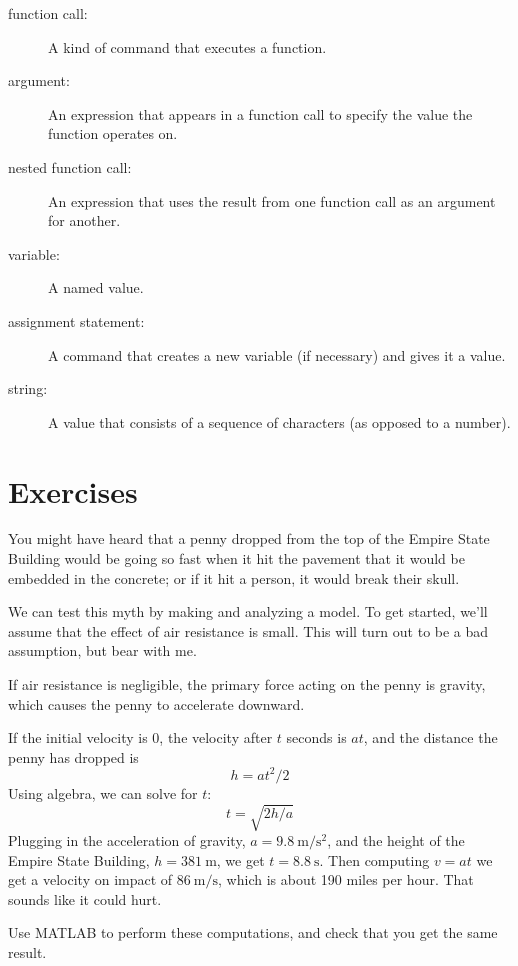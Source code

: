 \documentclass[main.tex]{subfiles}
\begin{document}
\begin{description}
\item[function call:] A kind of command that executes a function.

\item[argument:] An expression that appears in a function call to
specify the value the function operates on.

\item[nested function call:] An expression that uses the result from
one function call as an argument for another.

\item[variable:] A named value.

\item[assignment statement:] A command that creates a new variable
(if necessary) and gives it a value.

\item[string:] A value that consists of a sequence of characters (as
opposed to a number).


\end{description}


\section{Exercises}

\begin{ex}
\label{penny}
You might have heard that a penny dropped from the top of the Empire State Building would be going so fast when it hit the pavement that it would be embedded in the concrete; or if it hit a person, it would break their skull.


We can test this myth by making and analyzing a model.  To get started, we'll assume that the effect of air resistance is small.  This will turn out to be a bad assumption, but bear with me.

If air resistance is negligible, the primary force acting on the penny is gravity, which causes the penny to accelerate downward.


If the initial velocity is 0, the velocity after $t$ seconds is $a t$, and the distance the penny has dropped is
%
\[ h = a t^2 / 2 \]
%
Using algebra, we can solve for $t$:
%
\[ t = \sqrt{ 2 h / a} \]
%
Plugging in the acceleration of gravity, 
$a = \SI{9.8}{\meter\per\second\squared}$, and the height of the Empire State Building, 
$h = \SI{381}{\meter}$, we get 
$t = \SI{8.8}{\second}$.  
Then computing $v = a t$ we get a velocity on impact of $\SI{86}{\meter\per\second}$, which is about 190 miles per hour.  That sounds like it could hurt.

Use MATLAB to perform these computations, and check that you get the same result.
\end{ex}
\end{document}
